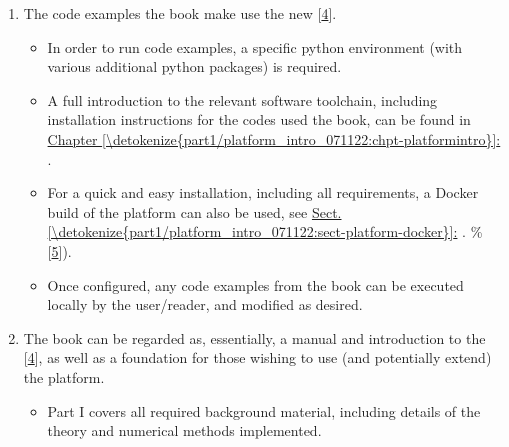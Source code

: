 \documentclass[letterpaper,table,10pt,english]{jupyterBook}
\begin{document}
\begin{enumerate}
\item {} 
\sphinxAtStartPar
The code examples  the book make use the new  {[}\hyperlink{cite.backmatter/bibliography:id618}{4}{]}.
\begin{itemize}
\item {} 
\sphinxAtStartPar
In order to run code examples, a specific python environment (with various additional python packages) is required.

\item {} 
\sphinxAtStartPar
A full introduction to the relevant software tool\sphinxhyphen{}chain, including installation instructions for the codes used  the book, can be found in \hyperref[\detokenize{part1/platform_intro_071122:chpt-platformintro}]{Chapter \ref{\detokenize{part1/platform_intro_071122:chpt-platformintro}}:} {\hyperref[\detokenize{part1/platform_intro_071122:chpt-platformintro}]{}}.

\item {} 
\sphinxAtStartPar
For a quick and easy installation, including all requirements, a Docker build  of the platform can also be used, see \hyperref[\detokenize{part1/platform_intro_071122:sect-platform-docker}]{Sect.\@ \ref{\detokenize{part1/platform_intro_071122:sect-platform-docker}}:} {\hyperref[\detokenize{part1/platform_intro_071122:sect-platform-docker}]{}}.  \%  {[}\hyperlink{cite.backmatter/bibliography:id621}{5}{]}).

\item {} 
\sphinxAtStartPar
Once configured, any code examples from the book can be executed locally by the user/reader, and modified as desired.

\end{itemize}

\item {} 
\sphinxAtStartPar
The book can be regarded as, essentially, a manual and introduction to the  {[}\hyperlink{cite.backmatter/bibliography:id618}{4}{]}, as well as a foundation for those wishing to use (and potentially extend) the platform.
\begin{itemize}
\item {} 
\sphinxAtStartPar
Part I covers all required background material, including details of the theory and numerical methods implemented.


\end{itemize}
\end{enumerate}
\end{document}
